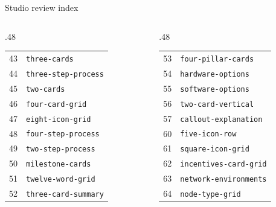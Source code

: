 \documentclass[aspectratio=169]{beamer}
\begin{document}
\begin{frame}{Studio review index}\fontsize{6.5}{9}\selectfont\begin{columns}[T]
\begin{column}{.48\textwidth}\begin{tabular}{rl}
43 & \texttt{three-cards} \\
44 & \texttt{three-step-process} \\
45 & \texttt{two-cards} \\
46 & \texttt{four-card-grid} \\
47 & \texttt{eight-icon-grid} \\
48 & \texttt{four-step-process} \\
49 & \texttt{two-step-process} \\
50 & \texttt{milestone-cards} \\
51 & \texttt{twelve-word-grid} \\
52 & \texttt{three-card-summary} \\
\end{tabular}\end{column}
\begin{column}{.48\textwidth}\begin{tabular}{rl}
53 & \texttt{four-pillar-cards} \\
54 & \texttt{hardware-options} \\
55 & \texttt{software-options} \\
56 & \texttt{two-card-vertical} \\
57 & \texttt{callout-explanation} \\
60 & \texttt{five-icon-row} \\
61 & \texttt{square-icon-grid} \\
62 & \texttt{incentives-card-grid} \\
63 & \texttt{network-environments} \\
64 & \texttt{node-type-grid} \\
\end{tabular}\end{column}
\end{columns}\end{frame}
\end{document}
